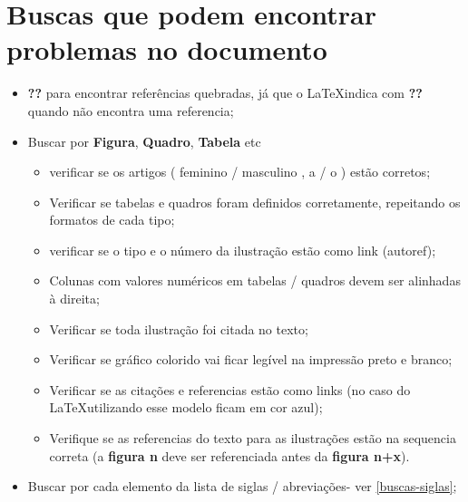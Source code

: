\section{Buscas que podem encontrar problemas no documento}
\label{buscas-documento}

\begin{itemize}
    \item \textbf{??} para encontrar referências quebradas, já que o \LaTeX \space indica com \textbf{??} quando não encontra uma referencia;
    
    \item Buscar por \textbf{Figura}, \textbf{Quadro}, \textbf{Tabela} etc
    
        \begin{itemize}
            \item verificar se os artigos ( feminino / masculino ,  a / o  ) estão corretos;
           
            \item Verificar se tabelas e quadros foram definidos corretamente, repeitando os formatos de cada tipo;
            
            \item verificar se o tipo e o número da ilustração estão como link (autoref);
           
            \item Colunas com valores numéricos em tabelas / quadros devem ser alinhadas à direita;
           
            \item Verificar se toda ilustração foi citada no texto;
           
            \item Verificar se gráfico colorido vai ficar legível na impressão preto e branco;
            
            \item Verificar se as citações e referencias estão como links (no caso do \LaTeX \space utilizando esse modelo ficam em cor azul);
          
            \item Verifique se as referencias do texto para as ilustrações estão na sequencia correta (a \textbf{figura n} deve ser referenciada antes da \textbf{figura n+x}).  
        \end{itemize}
        
    \item Buscar por cada elemento da lista de siglas / abreviações- ver \autoref{buscas-siglas};
    

\end{itemize}
